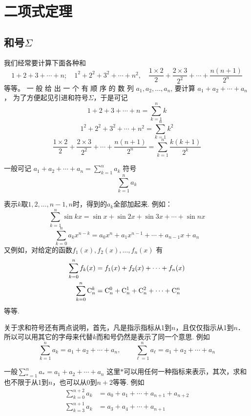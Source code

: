\section{二项式定理}

\subsection{和号$\Sigma$}

我们经常要计算下面各种和
$$1+ 2+ 3+ \cdots + n;\quad 1^{2}+ 2^{2}+ 3^{2}+ \cdots + n^{2},\quad \frac{1\times2}{2}+\frac{2\times3}{2^{2}}+\cdots+\frac{n(n+1)}{2^{n}}$$
等等。 一 般 给 出 一 个 有 顺 序 的 数 列 $a_1, a_2, \ldots , a_n$, 要计算
$a_{1}+a_{2}+\cdots+a_{n}$，
为了方便起见引进和符号$\Sigma$，于是可记
$$1+2+3+\cdots+n=\sum_{k=1}^{n}k$$
\[1^{2}+ 2^{2}+ 3^{2}+ \cdots + n^{2}=\sum^n_{k=1}k^2\]
\[\frac{1\times2}{2}+\frac{2\times3}{2^{2}}+\cdots+\frac{n(n+1)}{2^{n}}=\sum^n_{k=1}\frac{k(k+1)}{2^k}\]

一般可记
$a_1+a_2+\cdots+a_n=\sum_{k=1}^{n}a_k$
符号
$$\sum_{k=1}^{n}a_k$$

表示$k$取$1,2,\ldots,n-1,n$时，得到的$a_k$全部加起来.
例如：
$$\sum_{k=1}^{n}\sin kx=\sin x+\sin2x+\sin3x+\cdots+\sin nx$$
$$\sum _{k= 0}^{n}a_{k} x^{n- k}= a_{0} x^{n}+ a_{1} x^{n- 1}+ \cdots + a_{n- 1} x+ a_{n}$$
又例如，对给定的函数$f_1(x),f_2(x),\ldots,f_n(x)$
有
\[\begin{split}
\sum^n_{k=0}f_k(x)&=f_1(x)+f_2(x)+\cdots +f_n(x)
\\
\sum^n_{k=0}{\rm C}^{k}_{n} &={\rm C}^{0}_{n}+{\rm C}^{1}_{n}+{\rm C}^{2}_{n}+\cdots +{\rm C}^{n}_{n}
\end{split}\]
等等.

关于求和符号还有两点说明，首先，凡是指示指标从1到$n$，且仅仅指示从1到$n$．所以可以用其它的字母来代替$k$而和号仍然是表示了同一个意思. 例如
\[\sum^n_{k=1}a_k=a_1+a_2+\cdots+a_n,\qquad \sum^n_{\ell=1}a_{\ell}=a_1+a_2+\cdots+a_n\]

一般$\sum\limits^n_{*=1}a_*=a_1+a_2+\cdots+a_n$
这里$*$可以用任何一种指标来表示，其次，求和也不限于从1到$n$，也可以从0到$n+2$等等. 例如
\[\begin{split}
    \sum^{n+2}_{k=0}a_k&=a_0+a_1+\cdots+a_{n+1}+a_{n+2}\\
    \sum^{n+1}_{k=3}a_k&=a_3+a_4+\cdots+a_{n+1}
\end{split}\]

